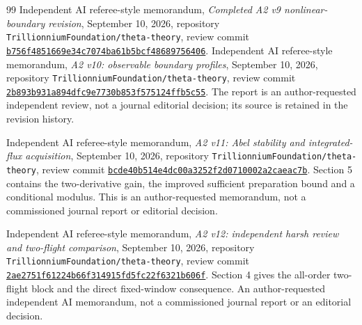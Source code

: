 \begin{thebibliography}{99}
Independent AI referee-style memorandum, \emph{Completed A2 v9
nonlinear-boundary revision}, September 10, 2026, repository
\texttt{TrillionniumFoundation/theta-theory}, review commit
\href{https://github.com/TrillionniumFoundation/theta-theory/commit/b756f4851669e34c7074ba61b5bcf48689756406}{\texttt{b756f4851669e34c7074ba61b5bcf48689756406}}.
Independent AI referee-style memorandum, \emph{A2 v10: observable
boundary profiles}, September 10, 2026, repository
\texttt{TrillionniumFoundation/theta-theory}, review commit
\href{https://github.com/TrillionniumFoundation/theta-theory/commit/2b893b931a894dfc9e7730b853f575124ffb5c55}{\texttt{2b893b931a894dfc9e7730b853f575124ffb5c55}}.
The report is an author-requested independent review, not a journal
editorial decision; its source is retained in the revision history.

Independent AI referee-style memorandum, \emph{A2 v11: Abel stability
and integrated-flux acquisition}, September 10, 2026, repository
\texttt{TrillionniumFoundation/theta-theory}, review commit
\href{https://github.com/TrillionniumFoundation/theta-theory/commit/bcde40b514e4dc00a3252f2d0710002a2caeac7b}{\texttt{bcde40b514e4dc00a3252f2d0710002a2caeac7b}}.
Section 5 contains the two-derivative gain, the improved sufficient
preparation bound and a conditional modulus. This is an author-requested
memorandum, not a commissioned journal report or editorial decision.

Independent AI referee-style memorandum, \emph{A2 v12: independent
harsh review and two-flight comparison}, September 10, 2026, repository
\texttt{TrillionniumFoundation/theta-theory}, review commit
\href{https://github.com/TrillionniumFoundation/theta-theory/commit/2ae2751f61224b66f314915fd5fc22f6321b606f}{\texttt{2ae2751f61224b66f314915fd5fc22f6321b606f}}.
Section 4 gives the all-order two-flight block and the direct fixed-window
consequence. An author-requested independent AI memorandum, not a
commissioned journal report or an editorial decision.
\end{thebibliography}
